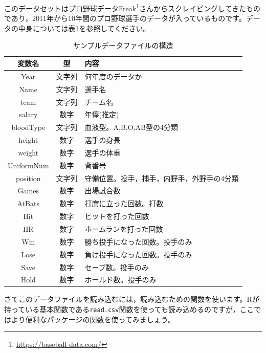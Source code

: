 \documentclass{ltjsbook}
\begin{document}
このデータセットはプロ野球データFreak\footnote{\url{https://baseball-data.com/}}さんからスクレイピングしてきたものであり，2011年から10年間のプロ野球選手のデータが入っているものです。データの中身については表\ref{BaseballDecade}を参照してください。
\begin{table}[b]
	\begin{center}
		\caption{サンプルデータファイルの構造}
		\begin{tabular}{ccl}
			変数名        & 型   & 内容                     \\\hline
			Year       & 文字列 & 何年度のデータか               \\
			Name       & 文字列 & 選手名                    \\
			team       & 文字列 & チーム名                   \\
			salary     & 数字  & 年俸(推定)                 \\
			bloodType  & 文字列 & 血液型。A,B,O,AB型の4分類      \\
			height     & 数字  & 選手の身長                  \\
			weight     & 数字  & 選手の体重                  \\
			UniformNum & 数字  & 背番号                    \\
			position   & 文字列 & 守備位置。投手，捕手，内野手，外野手の4分類 \\
			Games      & 数字  & 出場試合数                  \\
			AtBats     & 数字  & 打席に立った回数。打数            \\
			Hit        & 数字  & ヒットを打った回数              \\
			HR         & 数字  & ホームランを打った回数            \\
			Win        & 数字  & 勝ち投手になった回数。投手のみ        \\
			Lose       & 数字  & 負け投手になった回数。投手のみ        \\
			Save       & 数字  & セーブ数。投手のみ              \\
			Hold       & 数字  & ホールド数。投手のみ             \\\hline
		\end{tabular}
		\label{BaseballDecade}
	\end{center}
\end{table}

さてこのデータファイルを読み込むには，読み込むための関数を使います。Rが持っている基本関数である\texttt{read.csv}関数を使っても読み込めるのですが，ここではより便利なパッケージの関数を使ってみましょう。
\end{document}

